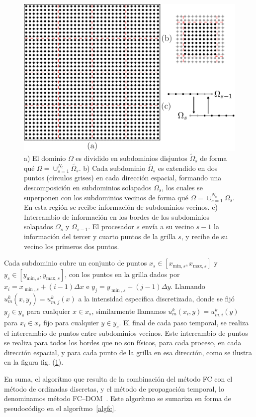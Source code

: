  \begin{figure}[h!]
  \centering
  \includegraphics[width=0.6\linewidth]{figuras/all.png}
  \caption{a) El dominio $\Omega$ es dividido en subdominios disjuntos $\widetilde{\Omega}_s$ de forma qué 
   $\Omega=\cup_{s=1}^{N_{c}}\widetilde{\Omega_s}$.
   b) Cada subdominio $\widetilde{\Omega_s}$ es extendido  
  en dos puntos (círculos grises) en cada dirección espacial, formando una descomposición en subdominios solapados $\Omega_s$, los cuales se superponen con los subdominios vecinos 
  de forma qué $\Omega=\cup_{s=1}^{N_{c}}\Omega_s$. 
  En esta región se recibe información de subdominios vecinos.
   c) Intercambio de información en los bordes de los subdominios solapados 
    $\Omega_s$ y $\Omega_{s-1}$. El 
   procesador $s$ envía a su vecino $s-1$ la información del tercer y cuarto puntos de la grilla $s$, y recibe de su vecino los primeros dos puntos.}
 \label{fig:bechange}
\end{figure}

 Cada subdominio cubre un conjunto de puntos  $x_s\in[x_{\text{min},s},x_{\text{max},s}]$ 
 y $y_s\in [y_{\text{min},s},y_{\text{max},s}]$, con los puntos 
 en la grilla dados por $x_i=x_{\min,s}+(i-1)\Delta x$ e $y_j=y_{\min,s}+(j-1)\Delta y$. 
 Llamando  $u_{m}^k(x,y_j)=u_{m,j}^k(x)$ a la intensidad específica discretizada,
  donde se fijó $y_j\in y_s$ para cualquier $x\in x_s$, similarmente llamamos $u_{m}^k(x_i,y)=u_{m,i}^k(y)$ 
  para $x_i\in x_s$ fijo para cualquier $y\in y_s$. El final de cada paso temporal, 
 se realiza el intercambio de puntos entre subdominios vecinos. 
 Este intercambio de puntos se realiza para todos los bordes que no son físicos, 
 para cada proceso, en cada dirección espacial, y para cada punto de la grilla 
 en esa dirección, como se ilustra en la figura fig. (\ref{fig:bechange}).

En suma, el algorítmo que resulta de la combinación del método FC con 
el método de ordinadas discretas, y el método de propagación temporal, 
lo denominamos método FC--DOM~\cite{Gaggioli2019}. Este algorítmo se 
sumariza en forma de pseudocódigo en el algorítmo~\eqref{algfc}.


